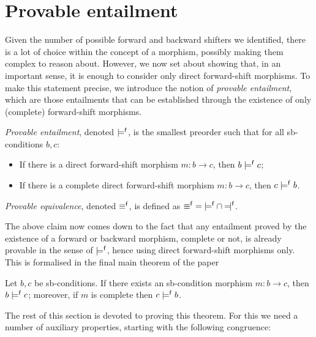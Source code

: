 \section{Provable entailment}

Given the number of possible forward and backward shifters we identified, there is a lot of choice within the concept of a morphism, possibly making them complex to reason about. However, we now set about showing that, in an important sense, it is enough to consider only direct forward-shift morphisms. To make this statement precise, we introduce the notion of \emph{provable entailment}, which are those entailments that can be established through the existence of only (complete) forward-shift morphisms.

\begin{definition}
\emph{Provable entailment}, denoted $\models^{\mathsf f}$, is the smallest preorder such that for all sb-conditions $b,c$:
\begin{itemize}[topsep=\smallskipamount]
\item If there is a direct forward-shift morphism $m:b\to c$, then $b\models^{\mathsf f} c$;
\item If there is a complete direct forward-shift morphism $m:b\to c$, then $c\models^{\mathsf f} b$.
\end{itemize}
\emph{Provable equivalence}, denoted $\equiv^{\mathsf f}$, is defined as ${\pequiv}={\pentails}\cap{\pentailedby}$.
\end{definition}
%
The above claim now comes down to the fact that any entailment proved by the existence of a forward or backward morphism, complete or not, is already provable in the sense of $\models^{\mathsf f}$, hence using direct forward-shift morphisms only. This is formalised in the final main theorem of the paper

\begin{theorem}
Let $b,c$ be sb-conditions. If there exists an sb-condition morphism $m:b\to c$, then $b\models^{\mathsf f} c$; moreover, if $m$ is complete then $c\models^{\mathsf f} b$.
\end{theorem}
%
The rest of this section is devoted to proving this theorem. For this we need a number of auxiliary properties, starting with the following congruence:

